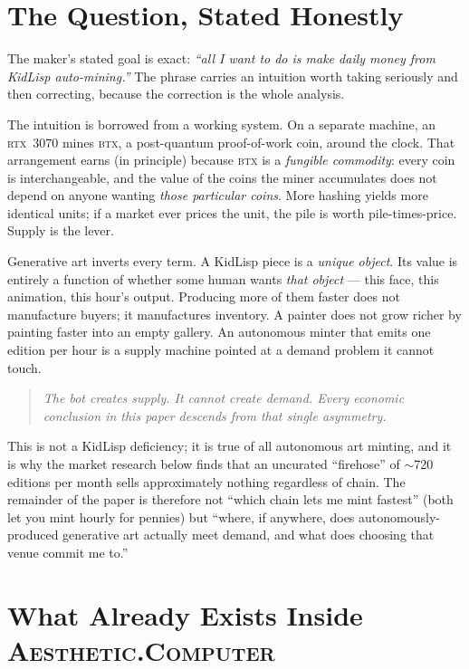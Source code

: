 \documentclass[10pt,letterpaper,twocolumn]{article}
\newcommand{\ac}{\textsc{Aesthetic.Computer}}
\begin{document}
\section{The Question, Stated Honestly}

The maker's stated goal is exact: \emph{``all I want to do is make daily money from KidLisp auto-mining.''} The phrase carries an intuition worth taking seriously and then correcting, because the correction is the whole analysis.

The intuition is borrowed from a working system. On a separate machine, an \textsc{rtx}~3070 mines \textsc{btx}, a post-quantum proof-of-work coin, around the clock. That arrangement earns (in principle) because \textsc{btx} is a \emph{fungible commodity}: every coin is interchangeable, and the value of the coins the miner accumulates does not depend on anyone wanting \emph{those particular coins}. More hashing yields more identical units; if a market ever prices the unit, the pile is worth pile-times-price. Supply is the lever.

Generative art inverts every term. A KidLisp piece is a \emph{unique object}. Its value is entirely a function of whether some human wants \emph{that object} --- this face, this animation, this hour's output. Producing more of them faster does not manufacture buyers; it manufactures inventory. A painter does not grow richer by painting faster into an empty gallery. An autonomous minter that emits one edition per hour is a supply machine pointed at a demand problem it cannot touch.

\begin{quote}
\small\itshape
The bot creates supply. It cannot create demand. Every economic conclusion in this paper descends from that single asymmetry.
\end{quote}

This is not a KidLisp deficiency; it is true of all autonomous art minting, and it is why the market research below finds that an uncurated ``firehose'' of $\sim$720 editions per month sells approximately nothing regardless of chain. The remainder of the paper is therefore not ``which chain lets me mint fastest'' (both let you mint hourly for pennies) but ``where, if anywhere, does autonomously-produced generative art actually meet demand, and what does choosing that venue commit me to.''

\section{What Already Exists Inside \ac{}}
\end{document}
